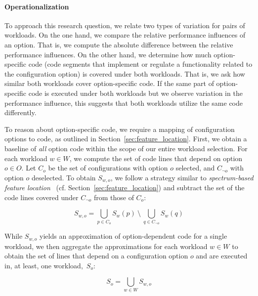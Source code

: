 
\paragraph*{Operationalization}
To approach this research question, we relate two types of variation for pairs of workloads. On the one hand, we compare the relative performance influences of an option. That is, we compute the absolute difference between the relative performance influences. On the other hand, we determine how much option-specific code (code segments that implement or regulate a functionality related to the configuration option) is covered under both workloads. That is, we ask how similar both workloads cover option-specific code. If the same part of option-specific code is executed under both workloads but we observe variation in the performance influence, this suggests that both workloads utilize the same code differently.

To reason about option-specific code, we require a mapping of configuration options to code, as outlined in Section~\ref{sec:feature_location}. First, we obtain a baseline of \textit{all} option code within the scope of our entire workload selection. For each workload $w \in W$, we compute the set of code lines that depend on option $o \in O$. Let $C_{o}$ be the set of configurations with option $o$ selected, and $C_{\neg o}$ with option $o$ deselected. To obtain $S_{w, o}$, we follow a strategy similar to \textit{spectrum-based feature location}~\cite{michelon_spectrum_2021} (cf. Section~\ref{sec:feature_location}) and subtract the set of the code lines covered under $C_{\neg o}$ from those of $C_{o}$:

\begin{equation}%
	S_{w, o} = \bigcup_{p \in C_{o}} S_{w}(p) ~ \setminus ~ \bigcup_{q \in C_{\neg o}} S_{w}(q)
\end{equation}

While $S_{w, o}$ yields an approximation of option-dependent code for a single workload, we then aggregate the approximations for each workload $w\in W$ to obtain the set of lines that depend on a configuration option $o$ and are executed in, at least, one workload,~$S_{o}$: 

\begin{equation}
	S_{o} = \bigcup_{w \in W} S_{w, o}
\end{equation}

